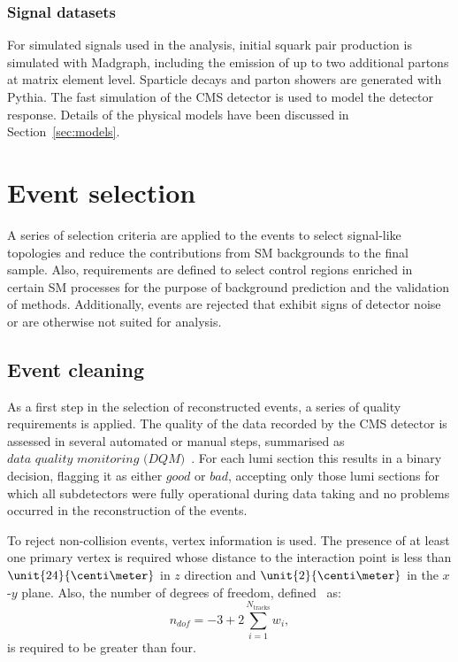 \subsubsection{Signal datasets}
For simulated signals used in the analysis, initial squark pair production is simulated with Madgraph, including the emission of up to two additional partons at matrix element level. Sparticle decays and parton showers are generated with Pythia. The fast simulation of the CMS detector is used to model the detector response. Details of the physical models have been discussed in Section~\ref{sec:models}.
\section{Event selection}
A series of selection criteria are applied to the events to select signal-like topologies and reduce the contributions from SM backgrounds to the final sample. Also, requirements are defined to select control regions enriched in certain SM processes for the purpose of background prediction and the validation of methods. Additionally, events are rejected that exhibit signs of detector noise or are otherwise not suited for analysis. 

\subsection{Event cleaning}
As a first step in the selection of reconstructed events, a series of quality requirements is applied. 
The quality of the data recorded by the CMS detector is assessed in several automated or manual steps, summarised as $\textit{data quality monitoring (DQM)}$~\cite{DQM}. For each lumi section this results in a binary decision, flagging it as either $\textit{good}$ or $\textit{bad}$, accepting only those lumi sections for which all subdetectors were fully operational during data taking and no problems occurred in the reconstruction of the events.

To reject non-collision events, vertex information is used. The presence of at least one primary vertex is required whose distance to the interaction point is less than $\unit{24}{\centi\meter}$ in $z$ direction and $\unit{2}{\centi\meter}$ in the $x$-$y$ plane. Also, the number of degrees of freedom, defined~\cite{Chatrchyan:2014fea} as:
\begin{equation}
n_{dof} = -3 + 2 \sum\limits_{i=1}^{N_{\text{tracks}}} w_i,
\end{equation}
is required to be greater than four.  

